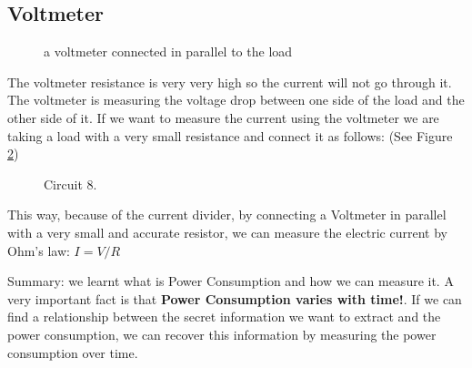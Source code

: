 \subsection{Voltmeter}
\begin{figure}[h]
    \centering
    
    \caption{a voltmeter connected in parallel to the load} \label{fig:circuit7}
\end{figure}
The voltmeter resistance is very very high so the current will not go through it. The voltmeter is measuring the voltage drop between one side of the load and the other side of it. If we want to measure the current using the voltmeter we are taking a load with a very small resistance and connect it as follows:
(See Figure \ref{fig:circuit8})
\pagebreak
\begin{figure}[h]
    \centering
    
    \caption{Circuit 8.} \label{fig:circuit8}
\end{figure}
This way, because of the current divider, by connecting a Voltmeter in parallel with a very small and accurate resistor, we can measure the electric current by Ohm's law: $I=V/R$
 
Summary: we learnt what is Power Consumption and how we can measure it.
A very important fact is that \textbf{Power Consumption varies with time!}.
If we can find a relationship between the secret information we want to extract and the power consumption, we can recover this information by measuring the power consumption over time.

